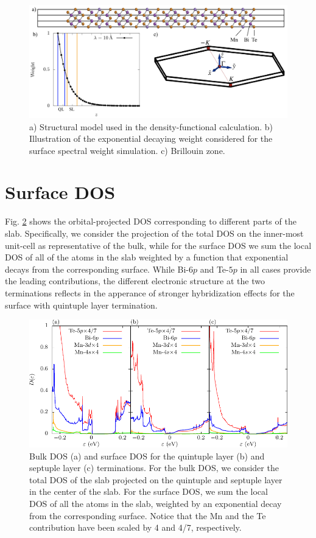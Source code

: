 \documentclass[showpacs, preprintnumbers, pra, superscriptaddress, floatfix, onecolumn, longbibliography]{revtex4-1}
\begin{document}
\begin{figure}[h!]
 \centering
 \includegraphics[width=14 cm]{structural_data.png}
	\caption{a) Structural model used in the density-functional calculation. b) Illustration of the exponential decaying weight considered for the surface spectral weight simulation. c) Brillouin zone.} 
	\label{dft_structure}
\end{figure}

\section{Surface DOS}

Fig. \ref{dft_dos} shows the orbital-projected DOS corresponding to different parts of the slab. Specifically, we consider the projection of the total DOS on the inner-most unit-cell as representative of the bulk, while for the surface DOS we sum the local DOS of all of the atoms in the slab weighted by a function that  exponential decays from the corresponding surface.
While Bi-$6p$ and Te-$5p$ in all cases provide the leading contributions, the different electronic structure at the two terminations reflects in the apperance of stronger hybridization effects for the surface with quintuple layer termination.

\begin{figure}[h!]
 \centering
 \includegraphics[width=15 cm]{dos.pdf}
	\caption{ Bulk DOS (a) and surface DOS for the quintuple layer (b) and septuple layer (c) terminations. For the bulk DOS, we consider the total DOS of the slab projected on the quintuple and septuple layer in the center of the slab.  For the surface DOS, we sum the local DOS of all the atoms in the slab, weighted by an exponential decay from the corresponding surface. Notice that the Mn and the Te contribution have been scaled by 4 and 4/7, respectively.	
}
	\label{dft_dos}
\end{figure}
\end{document}
